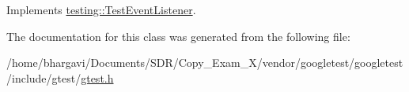 Implements \hyperlink{classtesting_1_1_test_event_listener_ab4f6a0ca16ae75daf385b3b5914e1048}{testing\+::\+Test\+Event\+Listener}.



The documentation for this class was generated from the following file\+:\begin{DoxyCompactItemize}
\item 
/home/bhargavi/\+Documents/\+S\+D\+R/\+Copy\+\_\+\+Exam\+\_\+X/vendor/googletest/googletest/include/gtest/\hyperlink{gtest_8h}{gtest.\+h}\end{DoxyCompactItemize}
